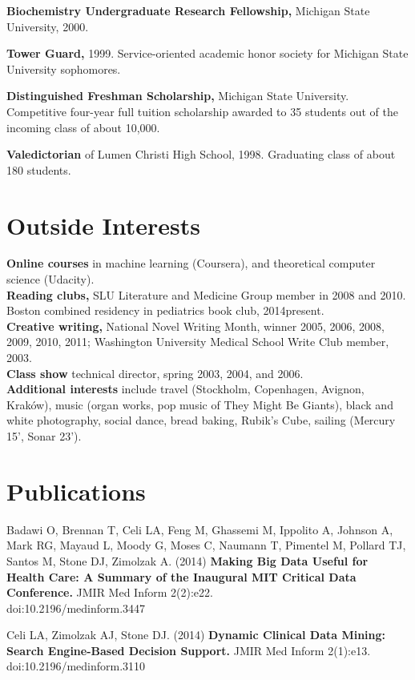 \documentclass[12pt]{article}
\begin{document}
\textbf{Biochemistry Undergraduate Research Fellowship,} Michigan State
University, 2000.

\textbf{Tower Guard,} 1999. Service-oriented academic honor
society for Michigan State University sophomores.

\textbf{Distinguished Freshman Scholarship,} Michigan State
University. Competitive four-year full tuition scholarship awarded to
35 students out of the incoming class of about 10,000.

\textbf{Valedictorian} of Lumen Christi High School, 1998. Graduating
class of about 180 students.

\section*{Outside Interests}

\textbf{Online courses} in machine learning (Coursera), and
theoretical computer science (Udacity).\\
\textbf{Reading clubs,} SLU Literature and Medicine Group member in
2008 and 2010. Boston combined residency in pediatrics book club,
2014\ndash{}present.\\
\textbf{Creative writing,} National Novel Writing Month, winner 2005, 2006,
2008, 2009, 2010, 2011; Washington University Medical School Write Club
member, 2003.\\
\textbf{Class show} technical director, spring 2003, 2004, and 2006.\\
\textbf{Additional interests} include travel (Stockholm, Copenhagen,
Avignon, Krak\'ow), music (organ works, pop music of They Might Be
Giants), black and white photography, social dance, bread baking,
Rubik's Cube, sailing (Mercury 15', Sonar 23').

\section*{Publications}
Badawi O, Brennan T, Celi LA, Feng M, Ghassemi M, Ippolito A, Johnson
A, Mark RG, Mayaud L, Moody G, Moses C, Naumann T, Pimentel M, Pollard
TJ, Santos M, Stone DJ, Zimolzak A. (2014) \textbf{Making Big Data
  Useful for Health Care: A Summary of the Inaugural MIT Critical Data
  Conference.} JMIR Med Inform 2(2):e22.\\
doi:10.2196/medinform.3447

Celi LA, Zimolzak AJ, Stone DJ. (2014) \textbf{Dynamic Clinical Data
  Mining: Search Engine-Based Decision Support.} JMIR Med Inform
2(1):e13.\\
doi:10.2196/medinform.3110
\end{document}
